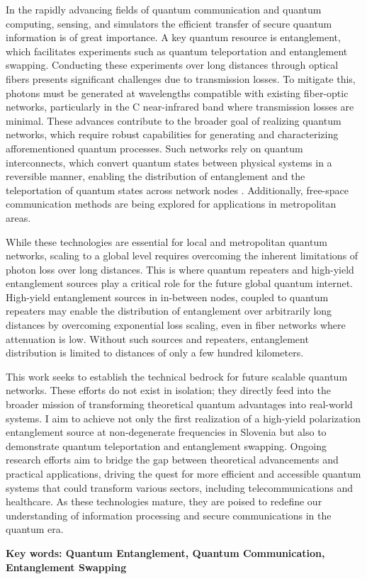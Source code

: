 \documentclass{article}
\theoremstyle{mytheoremstyle}
\theoremstyle{mytheoremstyle}
\theoremstyle{myproblemstyle}
\begin{document}
In the rapidly advancing fields of quantum communication and quantum computing, sensing, and simulators
the efficient transfer of secure quantum information is of great importance.
A key quantum resource is entanglement, which facilitates experiments such as quantum teleportation and entanglement swapping.
Conducting these experiments over long distances through optical fibers presents significant challenges due to transmission losses.
To mitigate this, photons must be generated at wavelengths compatible with existing fiber-optic networks,
particularly in the C near-infrared band where transmission losses are minimal.
These advances contribute to the broader goal of realizing quantum networks,
which require robust capabilities for generating and characterizing afforementioned quantum processes. %
Such networks rely on quantum interconnects, which convert quantum states between physical systems in a reversible manner,
enabling the distribution of entanglement and the teleportation of quantum states across network nodes \cite{Kimble_2008}.
Additionally, free-space communication methods \cite{Kržić_et_al_2023} are being explored for applications in metropolitan areas.
\par While these technologies are essential for local and metropolitan quantum networks, scaling to a global level requires overcoming
the inherent limitations of photon loss over long distances. This is where quantum repeaters and high-yield entanglement sources
play a critical role for the future global quantum internet. High-yield entanglement sources in in-between nodes, coupled to 
quantum repeaters may enable the distribution of entanglement over arbitrarily long distances by overcoming exponential loss scaling,
even in fiber networks where attenuation is low. Without such sources and repeaters, entanglement distribution is limited to distances
of only a few hundred kilometers.
\par This work seeks to establish the technical bedrock for future scalable quantum networks. These efforts do not exist in isolation;
they directly feed into the broader mission of transforming theoretical quantum advantages into real-world systems.
I aim to achieve not only the first realization of a high-yield polarization entanglement source at non-degenerate
frequencies in Slovenia but also to demonstrate quantum teleportation and entanglement swapping.
Ongoing research efforts aim to bridge the gap between theoretical advancements and practical applications,
driving the quest for more efficient and accessible quantum systems that could transform various sectors,
including telecommunications and healthcare. As these technologies mature, they are poised to redefine our
understanding of information processing and secure communications in the quantum era.
\par\textbf{Key words: Quantum Entanglement, Quantum Communication, Entanglement Swapping}
\end{document}
